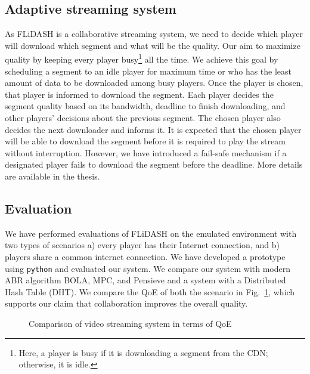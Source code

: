 \subsection{Adaptive streaming system}
As FLiDASH is a collaborative streaming system, we need to decide which player will download which segment and what will be the quality. Our aim to maximize quality by keeping every player busy\footnote{Here, a player is busy if it is downloading a segment from the CDN; otherwise, it is idle.} all the time. We achieve this goal by scheduling a segment to an idle player for maximum time or who has the least amount of data to be downloaded among busy players. Once the player is chosen, that player is informed to download the segment. Each player decides the segment quality based on its bandwidth, deadline to finish downloading, and other players' decisions about the previous segment. The chosen player also decides the next downloader and informs it. It is expected that the chosen player will be able to download the segment before it is required to play the stream without interruption. However, we have introduced a fail-safe mechanism if a designated player fails to download the segment before the deadline. More details are available in the thesis.

\subsection{Evaluation}
We have performed evaluations of FLiDASH on the emulated environment with two types of scenarios a) every player has their Internet connection, and b) players share a common internet connection. We have developed a prototype using {\tt python} and evaluated our system. We compare our system with modern ABR algorithm BOLA, MPC, and Pensieve and a system with a Distributed Hash Table (DHT). We compare the QoE of both the scenario in Fig.~\ref{fig:FLiDASH:QoE}, which supports our claim that collaboration improves the overall quality.
\begin{figure}[h]
	\captionsetup[subfigure]{width=0.49\linewidth}
	\begin{center}
	\end{center}
	\caption{\label{fig:FLiDASH:QoE}Comparison of video streaming system in terms of QoE}
\end{figure}
